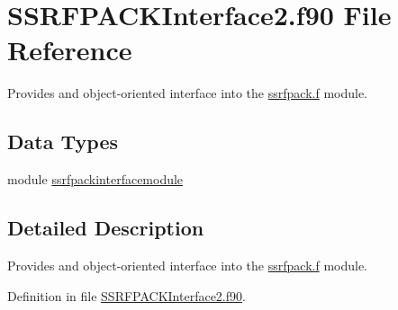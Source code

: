 \hypertarget{_s_s_r_f_p_a_c_k_interface2_8f90}{\section{S\+S\+R\+F\+P\+A\+C\+K\+Interface2.\+f90 File Reference}
\label{_s_s_r_f_p_a_c_k_interface2_8f90}
}


Provides and object-\/oriented interface into the \hyperlink{ssrfpack_8f_source}{ssrfpack.\+f} module.  


\subsection*{Data Types}
\begin{DoxyCompactItemize}
\item 
module \hyperlink{classssrfpackinterfacemodule}{ssrfpackinterfacemodule}
\end{DoxyCompactItemize}


\subsection{Detailed Description}
Provides and object-\/oriented interface into the \hyperlink{ssrfpack_8f_source}{ssrfpack.\+f} module. 



Definition in file \hyperlink{_s_s_r_f_p_a_c_k_interface2_8f90_source}{S\+S\+R\+F\+P\+A\+C\+K\+Interface2.\+f90}.

